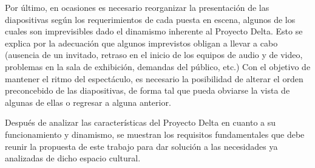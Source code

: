			Por último, en ocasiones es necesario reorganizar la presentación de las diapositivas según los requerimientos de cada puesta en escena, algunos de los cuales son imprevisibles dado el dinamismo inherente al Proyecto Delta. Esto se explica por la adecuación que algunos imprevistos obligan a llevar a cabo (ausencia de un invitado, retraso en el inicio de los equipos de audio y de video, problemas en la sala de exhibición, demandas del público, etc.) Con el objetivo de mantener el ritmo del espectáculo, es necesario la posibilidad de alterar el orden preconcebido de las diapositivas, de forma tal que pueda obviarse la vista de algunas de ellas o regresar a alguna anterior.			

		Después de analizar las características del Proyecto Delta en cuanto a su funcionamiento y dinamismo, se muestran los requisitos fundamentales que debe reunir la propuesta de este trabajo para dar solución a las necesidades ya analizadas de dicho espacio cultural.

